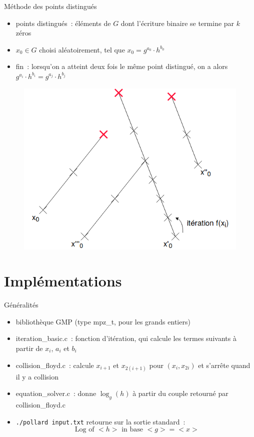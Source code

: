 \documentclass{beamer}
\begin{document}
  \begin{frame}{Méthode des points distingués}
    \begin{itemize}
        \item points distingués~: éléments de $G$ dont l'écriture binaire se termine par $k$ zéros
        \item $x_0 \in G$ choisi aléatoirement, tel que $x_0 = g^{a_0} \cdot h^{b_0}$
        \item fin~: lorsqu'on a atteint deux fois le même point distingué, on a alors $g^{a_i} \cdot h^{b_i} = g^{a_j} \cdot h^{b_j}$
    \end{itemize}
    \begin{figure}
      \center{}
      \includegraphics[scale=0.3]{images/lambda_distinguished_points.png}
      \caption{}
    \end{figure}
  \end{frame}


  \section{Implémentations}

  \begin{frame}{Généralités}
    \begin{itemize}
        \item bibliothèque GMP (type mpz\_t, pour les grands entiers)
        \item iteration\_basic.c~: fonction d'itération, qui calcule les termes suivants à partir de $x_i$, $a_i$ et $b_i$
        \item collision\_floyd.c~: calcule $x_{i+1}$ et $x_{2(i+1)}$ pour $(x_i,x_{2i})$ et s'arrête quand il y a collision
        \item equation\_solver.c~: donne $\log_g(h)$ à partir du couple retourné par collision\_floyd.c
        \item \texttt{./pollard input.txt} retourne sur la sortie standard~: 
        $$\text{\ Log of } <h> \text{\ in base } <g> = <x>$$
    \end{itemize}
  \end{frame}
\end{document}
